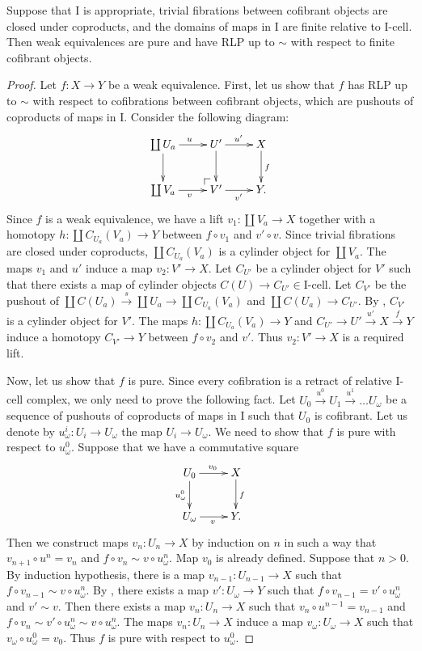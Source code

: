 \documentclass{amsart}
\makeatletter
\theoremstyle{definition}
\newcommand{\I}{\mathrm{I}}
\newcommand{\class}[2]{#1\text{-}\mathrm{#2}}
\newcommand{\Icell}[1][\I]{\class{#1}{cell}}
\newcommand{\po}[1][dr]{\save*!/#1+1.2pc/#1:(1,-1)@^{|-}\restore}
\makeatother
\begin{document}
\begin{prop}[we-pure]
Suppose that $\I$ is appropriate, trivial fibrations between cofibrant objects are closed under coproducts,
and the domains of maps in $\I$ are finite relative to $\Icell$.
Then weak equivalences are pure and have RLP up to $\sim$ with respect to finite cofibrant objects.
\end{prop}
\begin{proof}
Let $f : X \to Y$ be a weak equivalence.
First, let us show that $f$ has RLP up to $\sim$ with respect to
cofibrations between cofibrant objects, which are pushouts of coproducts of maps in $\I$.
Consider the following diagram:
\[ \xymatrix{ \coprod U_a \ar[r]^u \ar[d] &     U' \ar[r]^{u'} \ar[d] & X \ar[d]^f \\
              \coprod V_a \ar[r]_v        & \po V' \ar[r]_{v'}        & Y.
            } \]
Since $f$ is a weak equivalence, we have a lift $v_1 : \coprod V_a \to X$ together
with a homotopy $h : \coprod C_{U_a}(V_a) \to Y$ between $f \circ v_1$ and $v' \circ v$.
Since trivial fibrations are closed under coproducts, $\coprod C_{U_a}(V_a)$ is a cylinder object for $\coprod V_a$.
The maps $v_1$ and $u'$ induce a map $v_2 : V' \to X$.
Let $C_{U'}$ be a cylinder object for $V'$ such that there exists a map of cylinder objects $C(U) \to C_{U'} \in \Icell$.
Let $C_{V'}$ be the pushout of $\coprod C(U_a) \overset{s}\to \coprod U_a \to \coprod C_{U_a}(V_a)$ and $\coprod C(U_a) \to C_{U'}$.
By , $C_{V'}$ is a cylinder object for $V'$.
The maps $h : \coprod C_{U_a}(V_a) \to Y$ and $C_{U'} \to U' \overset{u'}\to X \overset{f}\to Y$
induce a homotopy $C_{V'} \to Y$ between $f \circ v_2$ and $v'$.
Thus $v_2 : V' \to X$ is a required lift.

Now, let us show that $f$ is pure.
Since every cofibration is a retract of relative $\I$-cell complex, we only need to prove the following fact.
Let $U_0 \xrightarrow{u^0} U_1 \xrightarrow{u^1} \ldots U_\omega$ be a
sequence of pushouts of coproducts of maps in $\I$ such that $U_0$ is cofibrant.
Let us denote by $u^i_\omega : U_i \to U_\omega$ the map $U_i \to U_\omega$.
We need to show that $f$ is pure with respect to $u^0_\omega$.
Suppose that we have a commutative square
\[ \xymatrix{ U_0      \ar[r]^{v_0} \ar[d]_{u^0_\omega} & X \ar[d]^f \\
              U_\omega \ar[r]_v                         & Y.
            } \]
Then we construct maps $v_n : U_n \to X$ by induction on $n$ in such a
way that $v_{n+1} \circ u^n = v_n$ and $f \circ v_n \sim v \circ u^n_\omega$.
Map $v_0$ is already defined.
Suppose that $n > 0$.
By induction hypothesis, there is a map $v_{n-1} : U_{n-1} \to X$
such that $f \circ v_{n-1} \sim v \circ u^n_\omega$.
By , there exists a map $v' : U_\omega \to Y$
such that $f \circ v_{n-1} = v' \circ u^n_\omega$ and $v' \sim v$.
Then there exists a map $v_n : U_n \to X$ such that $v_n \circ u^{n-1} = v_{n-1}$
and $f \circ v_n \sim v' \circ u^n_\omega \sim v \circ u^n_\omega$.
The maps $v_n : U_n \to X$ induce a map $v_\omega : U_\omega \to X$ such that $v_\omega \circ u^0_\omega = v_0$.
Thus $f$ is pure with respect to $u^0_\omega$.


\end{proof}
\end{document}
